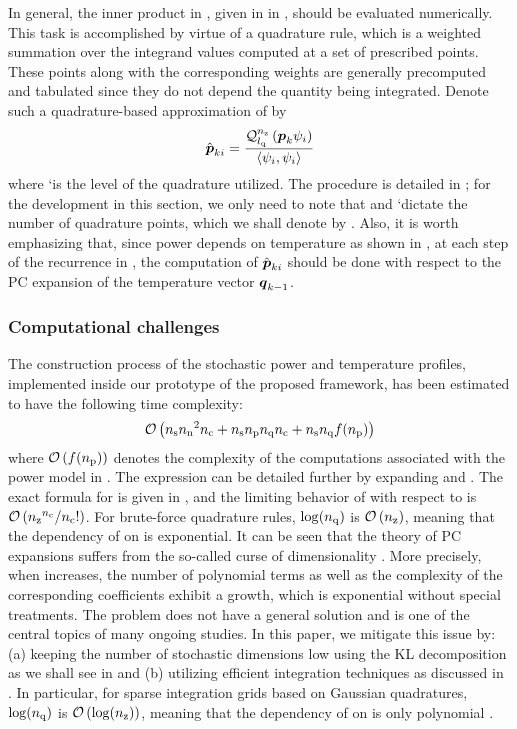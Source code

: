 In general, the inner product in , given in
 in , should be evaluated
numerically. This task is accomplished by virtue of a quadrature rule, which is
a weighted summation over the integrand values computed at a set of prescribed
points. These points along with the corresponding weights are generally
precomputed and tabulated since they do not depend the quantity being
integrated. Denote such a quadrature-based approximation of
 by
\begin{equation} \elab{pc-coefficients-quadrature}
  \hat{\vp}_{ki} = \frac{\quadrature{\nz}{\lq}{\vp_k \psi_i}}{\innerproduct{\psi_i}{\psi_i}}
\end{equation}
where \lq is the level of the quadrature utilized. The procedure is
detailed in ; for the development in this section, we
only need to note that \nz and \lq dictate the number of quadrature points,
which we shall denote by \nq. Also, it is worth emphasizing that, since power
depends on temperature as shown in , at each step of the
recurrence in , the computation of $\hat{\boldsymbol{p}}_{ki}$ should
be done with respect to the PC expansion of the temperature vector $\boldsymbol{q}_{k -
1}$.

\subsubsection{Computational challenges}

The construction process of the stochastic power and temperature profiles,
implemented inside our prototype of the proposed framework, has been estimated
to have the following time complexity:
\[
  \mathcal{O}\left({n_\mathrm{s}} {n_\mathrm{n}}^2 {n_\mathrm{c}} + {n_\mathrm{s}} {n_\mathrm{p}} {n_\mathrm{q}} {n_\mathrm{c}} + {n_\mathrm{s}} {n_\mathrm{q}} f({n_\mathrm{p}})\right)
\]
where $\mathcal{O}\left(f({n_\mathrm{p}})\right)$ denotes the complexity of the computations associated with
the power model in . The expression can be detailed further by
expanding \nc and \nq. The exact formula for \nc is given in ,
and the limiting behavior of \nc with respect to \nz is $\mathcal{O}\left({n_\mathrm{z}}^{n_\mathrm{c}} / {n_\mathrm{c}}!\right)$.
For brute-force quadrature rules, $\log({n_\mathrm{q}})$ is $\mathcal{O}\left({n_\mathrm{z}}\right)$, meaning that the
dependency of \nq on \nz is exponential. It can be seen that the theory of PC
expansions suffers from the so-called curse of dimensionality \cite{xiu2010,
eldred2008}. More precisely, when \nz increases, the number of polynomial terms
as well as the complexity of the corresponding coefficients exhibit a growth,
which is exponential without special treatments. The problem does not have a
general solution and is one of the central topics of many ongoing studies. In
this paper, we mitigate this issue by: (a) keeping the number of stochastic
dimensions low using the KL decomposition as we shall see in
 and (b) utilizing efficient integration
techniques as discussed in . In particular, for sparse
integration grids based on Gaussian quadratures, $\log({n_\mathrm{q}})$ is
$\mathcal{O}\left(\log({n_\mathrm{z}})\right)$, meaning that the dependency of \nq on \nz is only polynomial
\cite{heiss2008}.

